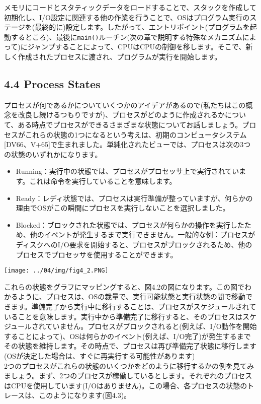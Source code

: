 メモリにコードとスタティックデータをロードすることで、スタックを作成して初期化し、I/O設定に関連する他の作業を行うことで、OSはプログラム実行のステージを(最終的に)設定します。したがって、エントリポイント(プログラムを起動するところ)、最後に\texttt{main()}ルーチン(次の章で説明する特殊なメカニズムによって)にジャンプすることによって、CPUはCPUの制御を移します。そこで、新しく作成されたプロセスに渡され、プログラムが実行を開始します。

\hypertarget{process-states}{%
\subsection*{4.4 Process States}\label{process-states}}

プロセスが何であるかについていくつかのアイデアがあるので(私たちはこの概念を改良し続けるつもりですが)、プロセスがどのように作成されるかについて、ある時点でプロセスができるさまざまな状態についてお話しましょう。プロセスがこれらの状態の1つになるという考えは、初期のコンピュータシステム{[}DV66、V+65{]}で生まれました。単純化されたビューでは、プロセスは次の3つの状態のいずれかになります。

\begin{itemize}
\item
  Running：実行中の状態では、プロセスがプロセッサ上で実行されています。これは命令を実行していることを意味します。
\item
  Ready：レディ状態では、プロセスは実行準備が整っていますが、何らかの理由でOSがこの瞬間にプロセスを実行しないことを選択しました。
\item
  Blocked：ブロックされた状態では、プロセスが何らかの操作を実行したため、他のイベントが発生するまで実行できません。一般的な例：プロセスがディスクへのI/O要求を開始すると、プロセスがブロックされるため、他のプロセスでプロセッサを使用することができます。
\end{itemize}

\texttt{[image: ../04/img/fig4\_2.PNG]}

これらの状態をグラフにマッピングすると、図4.2の図になります。この図でわかるように、プロセスは、OSの裁量で、実行可能状態と実行状態の間で移動できます。準備完了から実行中に移行することは、プロセスがスケジュールされていることを意味します。実行中から準備完了に移行すると、そのプロセスはスケジュールされていません。プロセスがブロックされると(例えば、I/O動作を開始することによって)、OSは何らかのイベント(例えば、I/O完了)が発生するまでその状態を維持します。その時点で、プロセスは再び準備完了状態に移行します(OSが決定した場合は、すぐに再実行する可能性があります)\\
2つのプロセスがこれらの状態のいくつかをどのように移行するかの例を見てみましょう。まず、2つのプロセスが稼働しているとします。それぞれのプロセスはCPUを使用しています(I/Oはありません)。この場合、各プロセスの状態のトレースは、このようになります(図4.3)。

